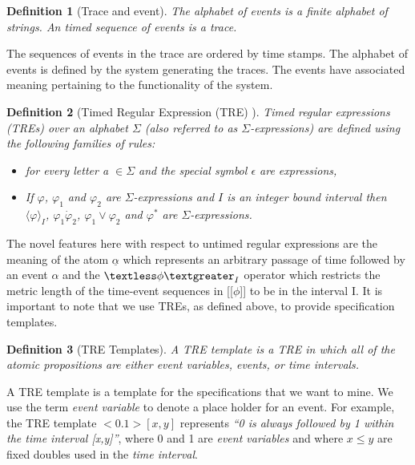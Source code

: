 \documentclass[]{sigplanconf}
\begin{document}
\newtheorem{defns}{Definition}

\begin{defns}[Trace and event]
The alphabet of events is a finite alphabet of strings. An timed sequence of events is a trace.
\end{defns}

The sequences of events in the trace are ordered by time stamps.
The alphabet of events is defined by the system generating the traces. The events have associated meaning pertaining to the functionality of the system.


\begin{defns}[Timed Regular Expression (TRE) \cite{timedregex}]
Timed regular expressions (TREs) over an alphabet $\Sigma$ (also referred to as $\Sigma$-expressions) are defined using the following families of rules:
\begin{itemize}
  \item  {} for every letter a $\in \Sigma$ and the special symbol $\epsilon$ are expressions,
  \item If $\varphi$, $\varphi_1$ and $\varphi_2$ are $\Sigma$-expressions and $I$ is an integer bound interval then $\langle \varphi \rangle_I$, $\varphi_1 \dot \varphi_2$, $\varphi_1 \vee \varphi_2$ and $\varphi^*$ are $\Sigma$-expressions.
\end{itemize}
\end{defns}

The novel features here with respect to untimed regular expressions are the meaning of the atom $\underline{\alpha}$ which represents an arbitrary passage of time followed by an event $\alpha$ and the $\textless \phi \textgreater _I$ operator which restricts the metric length of the time-event sequences in [[$\phi$]] to be in the interval I. It is important to note that we use TREs, as defined above, to provide specification templates.


\begin{defns}[TRE Templates]
A TRE template is a TRE in which all of the atomic propositions are either event variables, events, or time intervals.
\end{defns}

A TRE template is a template for the specifications that we want to mine. We use the term \emph{event variable} to denote a place holder for an event. For example, the TRE template $<0.1>[x,y]$ represents \emph{``0 is always followed by 1 within the time interval [x,y]''}, where 0 and 1 are \emph{event variables} and where $x \le y$ are fixed doubles used in the \emph{time interval}.
\end{document}
